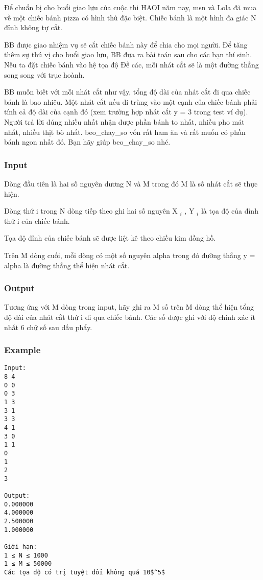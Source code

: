 



   Để chuẩn bị cho buổi giao lưu của cuộc thi HAOI năm nay, msn và Lola đã mua về một chiếc bánh pizza có hình thù đặc biệt. Chiếc bánh là một hình đa giác N đỉnh không tự cắt.  

   BB được giao nhiệm vụ sẽ cắt chiếc bánh này để chia cho mọi người. Để tăng thêm sự thú vị cho buổi giao lưu, BB đưa ra bài toán sau cho các bạn thí sinh. Nếu ta đặt chiếc bánh vào hệ tọa độ Đề các, mỗi nhát cắt sẽ là một đường thẳng song song với trục hoành.  

   BB muốn biết với mỗi nhát cắt như vậy, tổng độ dài của nhát cắt đi qua chiếc bánh là bao nhiêu. Một nhát cắt nếu đi trùng vào một cạnh của chiếc bánh phải tính cả độ dài của cạnh đó (xem trường hợp nhát cắt y = 3 trong test ví dụ). Người trả lời đúng nhiều nhất nhận được phần bánh to nhất, nhiều pho mát nhất, nhiều thịt bò nhất. beo\_chay\_so vốn rất ham ăn và rất muốn có phần bánh ngon nhất đó. Bạn hãy giúp beo\_chay\_so nhé.  

\subsubsection{   Input  }

   Dòng đầu tiên là hai số nguyên dương N và M trong đó M là số nhát cắt sẽ thực hiện.  

   Dòng thứ i trong N dòng tiếp theo ghi hai số nguyên X   $_    i   $   , Y   $_    i   $   là tọa độ của đỉnh thứ i của chiếc bánh.  

   Tọa độ đỉnh của chiếc bánh sẽ được liệt kê theo chiều kim đồng hồ.  

   Trên M dòng cuối, mỗi dòng có một số nguyên alpha trong đó đường thẳng y = alpha là đường thẳng thể hiện nhát cắt.  

\subsubsection{   Output  }

   Tương ứng với M dòng trong input, hãy ghi ra M số trên M dòng thể hiện tổng độ dài của nhát cắt thứ i đi qua chiếc bánh. Các số được ghi với độ chính xác ít nhất 6 chữ số sau dấu phẩy.  

\subsubsection{   Example  }
\begin{verbatim}
Input:
8 4
0 0
0 3
1 3
3 1
3 3
4 1
3 0
1 1
0
1
2
3

Output:
0.000000
4.000000
2.500000
1.000000

Giới hạn:
1 ≤ N ≤ 1000 
1 ≤ M ≤ 50000
Các tọa độ có trị tuyệt đối không quá 10$^5$\end{verbatim}